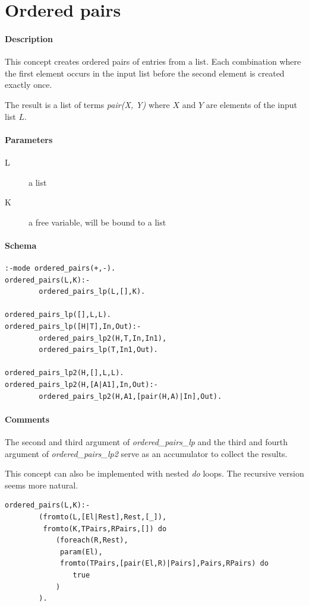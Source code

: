 \documentclass[a4paper,12pt]{report}
\begin{document}
\pagebreak
\section{Ordered pairs}
\paragraph{Description}
This concept creates ordered pairs of entries from a list. Each combination where the first element occurs in the input list before the second element is created exactly once.

The result is a list of terms {\it pair(X, Y)} where $X$ and $Y$ are elements of the input list $L$.
\paragraph{Parameters}
\begin{description}
\item[L] a list
\item[K] a free variable, will be bound to a list
\end{description}
\paragraph{Schema}
\begin{verbatim}
:-mode ordered_pairs(+,-).
ordered_pairs(L,K):-
        ordered_pairs_lp(L,[],K).

ordered_pairs_lp([],L,L).
ordered_pairs_lp([H|T],In,Out):-
        ordered_pairs_lp2(H,T,In,In1),
        ordered_pairs_lp(T,In1,Out).

ordered_pairs_lp2(H,[],L,L).
ordered_pairs_lp2(H,[A|A1],In,Out):-
        ordered_pairs_lp2(H,A1,[pair(H,A)|In],Out).
\end{verbatim}
\pagebreak
\paragraph{Comments}
The second and third argument of {\it ordered\_pairs\_lp} and the third and fourth argument of {\it ordered\_pairs\_lp2} serve as an accumulator to collect the results.

This concept can also be implemented with nested {\it do} loops. The recursive version seems more natural.
\begin{verbatim}
ordered_pairs(L,K):-
        (fromto(L,[El|Rest],Rest,[_]),
         fromto(K,TPairs,RPairs,[]) do
            (foreach(R,Rest),
             param(El),
             fromto(TPairs,[pair(El,R)|Pairs],Pairs,RPairs) do
                true
            )
        ).
\end{verbatim}
\end{document}
